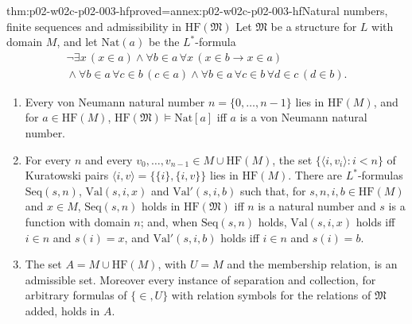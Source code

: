 \begin{hbtheorem}{thm:p02-w02c-p02-003-hf}{proved=annex:p02-w02c-p02-003-hf}{Natural numbers, finite sequences and admissibility in \(\mathrm{HF}(\mathfrak M)\)}
Let \(\mathfrak M\) be a structure for \(L\) with domain \(M\), and let
\(\mathrm{Nat}(a)\) be the \(L^{*}\)-formula
\[
\begin{gathered}
 \neg\exists x\,(x\in a)\land
 \forall b\in a\,\forall x\,(x\in b\to x\in a)\\
 {}\land\forall b\in a\,\forall c\in b\,(c\in a)\land
 \forall b\in a\,\forall c\in b\,\forall d\in c\,(d\in b).
\end{gathered}
\]
\begin{enumerate}
\item Every von Neumann natural number \(n=\{0,\ldots,n-1\}\) lies in
      \(\mathrm{HF}(M)\), and for \(a\in\mathrm{HF}(M)\),
      \(\mathrm{HF}(\mathfrak M)\models\mathrm{Nat}[a]\) iff \(a\) is a von
      Neumann natural number.
\item For every \(n\) and every \(v_0,\ldots,v_{n-1}\in M\cup\mathrm{HF}(M)\),
      the set \(\{\langle i,v_i\rangle:i<n\}\) of Kuratowski pairs
      \(\langle i,v\rangle=\{\{i\},\{i,v\}\}\) lies in \(\mathrm{HF}(M)\).
      There are \(L^{*}\)-formulas \(\mathrm{Seq}(s,n)\),
      \(\mathrm{Val}(s,i,x)\) and \(\mathrm{Val}'(s,i,b)\) such that, for
      \(s,n,i,b\in\mathrm{HF}(M)\) and \(x\in M\),
      \(\mathrm{Seq}(s,n)\) holds in \(\mathrm{HF}(\mathfrak M)\) iff \(n\)
      is a natural number and \(s\) is a function with domain \(n\); and,
      when \(\mathrm{Seq}(s,n)\) holds, \(\mathrm{Val}(s,i,x)\) holds iff
      \(i\in n\) and \(s(i)=x\), and \(\mathrm{Val}'(s,i,b)\) holds iff
      \(i\in n\) and \(s(i)=b\).
\item The set \(A=M\cup\mathrm{HF}(M)\), with \(U=M\) and the membership
      relation, is an admissible set.  Moreover every instance of
      separation and collection, for arbitrary formulas of \(\{\in,U\}\)
      with relation symbols for the relations of \(\mathfrak M\) added,
      holds in \(A\).
\end{enumerate}
\end{hbtheorem}

